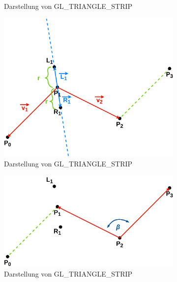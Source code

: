 \documentclass[doktyp=studarbeit]{TUBAFarbeiten}
\begin{document}
\begin{figure}[!htb]
\begin{subfigure}[b]{0.45\textwidth}
        \caption{Darstellung von GL\_TRIANGLE\_STRIP}
    \end{subfigure}
    \qquad
    \begin{subfigure}[b]{0.45\textwidth}
        \centering
        \includegraphics[width=1\linewidth]{Schlangenlinie-4.png}
        \caption{Darstellung von GL\_TRIANGLE\_STRIP}
    \end{subfigure}
    \qquad
    \begin{subfigure}[b]{0.45\textwidth}
        \centering
        \includegraphics[width=1\linewidth]{Schlangenlinie-5.png}
        \caption{Darstellung von GL\_TRIANGLE\_STRIP}
    \end{subfigure}
    \qquad
    \begin{subfigure}[b]{0.45\textwidth}
        \centering

\end{subfigure}
\end{figure}
\end{document}
